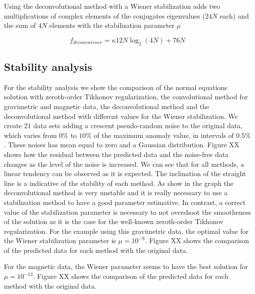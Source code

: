 Using the deconvolutional method with a Wiener stabilization adds two multiplications of complex elements of the conjugates eigenvalues ($24N$ each) and the sum of $4N$ elements with the stabilization parameter $\mu$

\begin{equation}
	f_{deconvwiener} = \kappa12N\log_2(4N) + 76N
	\label{deconvwiener}
\end{equation}

\subsection{Stability analysis}

For the stability analysis we show the comparison of the normal equations solution with zeroth-order Tikhonov regularization, the convolutional method for gravimetric and magnetic data, the deconvolutional method and the deconvolutional method with different values for the Wiener stabilization. We create $21$ data sets adding a crescent pseudo-random noise to the original data, which varies from $0\%$ to $10\%$ of the maximum anomaly value, in intervals of $0.5\%$. These noises has mean equal to zero and a Gaussian distribution.
Figure XX shows how the residual between the predicted data and the noise-free data changes as the level of the noise is increased. We can see that for all methods, a linear tendency can be observed as it is expected. The inclination of the straight line is a indicative of the stability of each method. As show in the graph the deconvolutional method is very unstable and it is really necessary to use a stabilization method to have a good parameter estimative. In contrast, a correct value of the stabilization parameter is necessary to not overshoot the smootheness of the solution as it is the case for the well-known zeroth-order Tikhonov regularization. For the example using this gravimetric data, the optimal value for the Wiener stabilization parameter is $\mu = 10^{-9}$. Figure XX shows the comparison of the predicted data for each method with the original data.

For the magnetic data, the Wiener parameter seems to have the best solution for $\mu = 10^{-13}$. Figure XX shows the comparison of the predicted data for each method with the original data.
